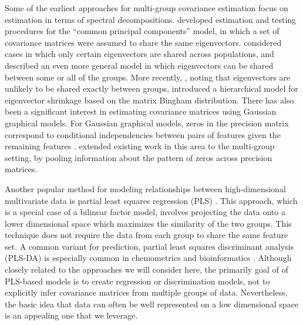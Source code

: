 \documentclass[12pt]{article}
\begin{document}

Some of the earliest approaches for multi-group covariance estimation
focus on estimation in terms of spectral decompositions.
\cite{Flury1987} developed estimation and testing procedures for the
``common principal components'' model, in which a set of covariance
matrices were assumed to share the same eigenvectors.
\citet{Schott1991, Schott1999} considered cases in which only certain
eigenvectors are shared across populations, and \citet{Boik2002}
described an even more general model in which eigenvectors can be
shared between some or all of the groups.  More recently,
\citet{Hoff2009}, noting that eigenvectors are unlikely to be shared
exactly between groups, introduced a hierarchical model for
eigenvector shrinkage based on the matrix Bingham distribution.  There
has also been a significant interest in estimating covariance matrices
using Gaussian graphical models. For Gaussian graphical models, zeros
in the precision matrix correspond to conditional independencies
between pairs of features given the remaining features
\citep{Meinshausen2006}.  \citet{Witten2014} extended existing work in
this area to the multi-group setting, by pooling information about the
pattern of zeros across precision matrices.


Another popular method for modeling relationships between
high-dimensional multivariate data is partial least squares regression
(PLS) \citep{Wold2001}. This approach, which is a special case of a bilinear factor
model, involves projecting the data onto a lower dimensional space which
maximizes the similarity of the two groups.  This technique does not
require the data from each group to share the same feature set.  A
common variant for prediction, partial least squares discriminant
analysis (PLS-DA) is especially common in chemometrics and
bioinformatics \citep{Barker2003} .  Although closely related to the
approaches we will consider here, the primarily goal of of PLS-based
models is to create regression or discrimination models, not to
explicitly infer covariance matrices from multiple groups of data.
Nevertheless, the basic idea that data can often be well represented
on a low dimensional space is an appealing one that we leverage.
\end{document}

